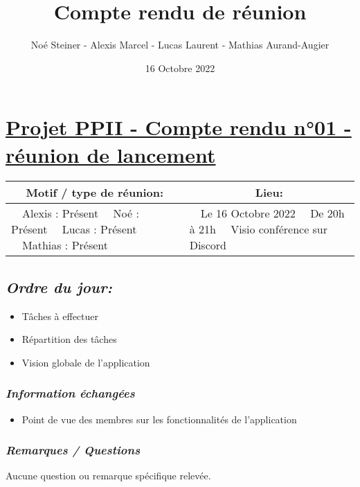 \documentclass[french,a4paper]{article}
\author{Noé Steiner - Alexis Marcel - Lucas Laurent - Mathias Aurand-Augier}
\date{16 Octobre 2022}
\newcommand{\tabitem}{\textbullet~~}\title{Compte rendu de réunion}
\begin{document}
\maketitle

\section*{\underline{Projet PPII - Compte rendu n°01 - réunion de lancement}}

\begin{table}[!htb]
  \centering
  \begin{tabular}{| p{7cm} | p{7cm} |}
    \hline
    \multicolumn{1}{|c|}{ Motif / type de réunion:} & \multicolumn{1}{c|}{Lieu:} \\
    \hline
    \tabitem Alexis : Présent\newline
    \tabitem Noé : Présent\newline
    \tabitem Lucas : Présent\newline
    \tabitem Mathias : Présent                      &
    \tabitem Le 16 Octobre 2022\newline
    \tabitem De 20h à 21h\newline
    \tabitem Visio conférence sur Discord                                                                   \\
    \hline
  \end{tabular}
\end{table}

\subsection*{\textit{Ordre du jour:}}

\begin{itemize}
  \item Tâches à effectuer
  \item Répartition des tâches
  \item Vision globale de l'application
\end{itemize}

\subsubsection*{\textit{Information échangées}}
\begin{itemize}
  \item Point de vue des membres sur les fonctionnalités de l'application
\end{itemize}
\subsubsection*{\textit{Remarques / Questions}}
Aucune question ou remarque spécifique relevée.
\end{document}
